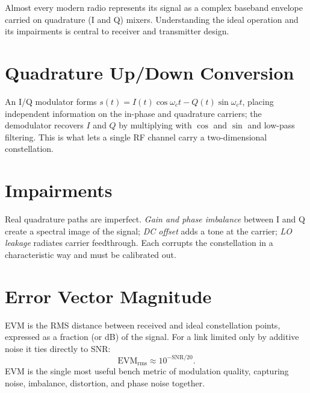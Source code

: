 Almost every modern radio represents its signal as a complex baseband envelope
carried on quadrature (I and Q) mixers. Understanding the ideal operation and its
impairments is central to receiver and transmitter design.

\section{Quadrature Up/Down Conversion}
An I/Q modulator forms $s(t) = I(t)\cos\omega_c t - Q(t)\sin\omega_c t$, placing
independent information on the in-phase and quadrature carriers; the demodulator
recovers $I$ and $Q$ by multiplying with $\cos$ and $\sin$ and low-pass
filtering. This is what lets a single RF channel carry a two-dimensional
constellation.

\section{Impairments}
Real quadrature paths are imperfect. \emph{Gain and phase imbalance} between I and
Q create a spectral image of the signal; \emph{DC offset} adds a tone at the
carrier; \emph{LO leakage} radiates carrier feedthrough. Each corrupts the
constellation in a characteristic way and must be calibrated out.

\section{Error Vector Magnitude}
EVM is the RMS distance between received and ideal constellation points, expressed
as a fraction (or dB) of the signal. For a link limited only by additive noise it
ties directly to SNR:
\[ \text{EVM}_{\text{rms}} \approx 10^{-\text{SNR}/20}. \]
EVM is the single most useful bench metric of modulation quality, capturing noise,
imbalance, distortion, and phase noise together.
